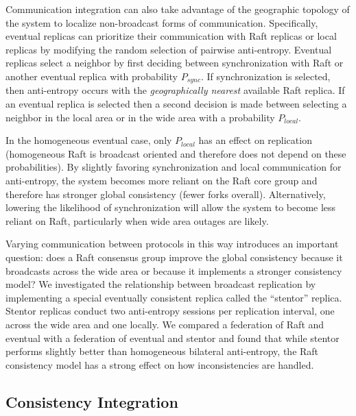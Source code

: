 \documentclass[10pt,conference,letterpaper]{IEEEtran}
\begin{document}
Communication integration can also take advantage of the geographic topology of the
system to localize non-broadcast forms of communication.
Specifically, eventual replicas can prioritize their communication with Raft replicas or
local replicas by modifying the random selection of pairwise anti-entropy.
Eventual replicas select a neighbor by first deciding between synchronization with Raft
or another eventual replica with probability $P_{sync}$.
If synchronization is selected, then anti-entropy occurs with the \textit{geographically
nearest} available Raft replica.
If an eventual replica is selected then a second decision is made between selecting a
neighbor in the local area or in the wide area with a probability $P_{local}$.

In the homogeneous eventual case, only $P_{local}$ has an effect on replication
(homogeneous Raft is broadcast oriented and therefore does not depend on these
probabilities).
By slightly favoring synchronization and local communication for anti-entropy, the
system becomes more reliant on the Raft core group and therefore has stronger global
consistency (fewer forks overall).
Alternatively, lowering the likelihood of synchronization will allow the system to become
less reliant on Raft, particularly when wide area outages are likely.

Varying communication between protocols in this way introduces an important question:
does a Raft consensus group improve the global consistency because it broadcasts across
the wide area or because it implements a stronger consistency model?
We investigated the relationship between broadcast replication by implementing a special
eventually consistent replica called the ``stentor'' replica.
Stentor replicas conduct two anti-entropy sessions per replication interval, one across the wide area and one locally.
We compared a federation of Raft and eventual with a federation of eventual and stentor
and found that while stentor performs slightly better than homogeneous bilateral anti-entropy, the Raft consistency model has a strong effect on how inconsistencies are
handled.

\subsection{Consistency Integration}
\end{document}
